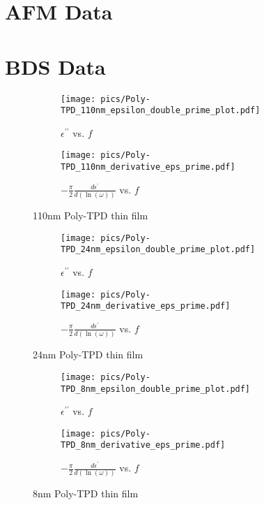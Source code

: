 \appendix



\chapter{AFM Data}

\chapter{BDS Data}

\begin{figure}[!htb]
\centering
\begin{subfigure}[t]{.5\textwidth}
  \centering
  \texttt{[image: pics/Poly-TPD\_110nm\_epsilon\_double\_prime\_plot.pdf]}
  \caption{$\epsilon^{\prime\prime}$ vs. $f$}
  \label{fig:sub1}
\end{subfigure}%
\begin{subfigure}[t]{.5\textwidth}
  \centering
  \texttt{[image: pics/Poly-TPD\_110nm\_derivative\_eps\_prime.pdf]}
  \caption{$-\frac{\pi}{2}\frac{d\epsilon^{\prime}}{d\left(\ln \left( \omega \right)   \right) }$ vs. $f$}
\end{subfigure}
\caption{110nm Poly-TPD thin film}
  \label{110tpd}
\end{figure}

\begin{figure}[!htb]
\centering
\begin{subfigure}[t]{.5\textwidth}
  \centering
  \texttt{[image: pics/Poly-TPD\_24nm\_epsilon\_double\_prime\_plot.pdf]}
  \caption{$\epsilon^{\prime\prime}$ vs. $f$}
  \label{fig:sub1}
\end{subfigure}%
\begin{subfigure}[t]{.5\textwidth}
  \centering
  \texttt{[image: pics/Poly-TPD\_24nm\_derivative\_eps\_prime.pdf]}
  \caption{$-\frac{\pi}{2}\frac{d\epsilon^{\prime}}{d\left(\ln \left( \omega \right)   \right) }$ vs. $f$}
  \label{fig:sub2}
\end{subfigure}
\caption{24nm Poly-TPD thin film}
  \label{24tpd}
\end{figure}


\begin{figure}[!htb]
\centering
\begin{subfigure}[t]{.5\textwidth}
  \centering
  \texttt{[image: pics/Poly-TPD\_8nm\_epsilon\_double\_prime\_plot.pdf]}
  \caption{$\epsilon^{\prime\prime}$ vs. $f$}
  \label{fig:sub1}
\end{subfigure}%
\begin{subfigure}[t]{.5\textwidth}
  \centering
  \texttt{[image: pics/Poly-TPD\_8nm\_derivative\_eps\_prime.pdf]}
  \caption{$-\frac{\pi}{2}\frac{d\epsilon^{\prime}}{d\left(\ln \left( \omega \right)   \right) }$ vs. $f$}
  \label{fig:sub2}
\end{subfigure}
\caption{8nm Poly-TPD thin film}
  \label{8tpd}
\end{figure}


